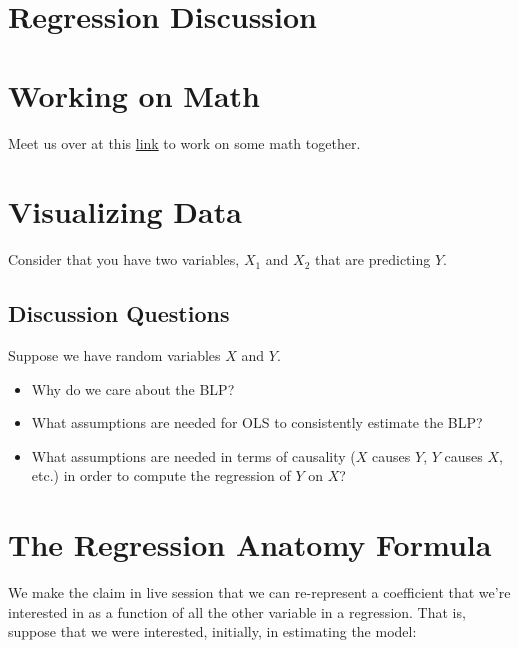 \documentclass[
]{book}
\providecommand{\tightlist}{%
  \setlength{\itemsep}{0pt}\setlength{\parskip}{0pt}}
\theoremstyle{definition}
\theoremstyle{definition}
\theoremstyle{definition}
\theoremstyle{definition}
\theoremstyle{remark}
\begin{document}
\hypertarget{regression-discussion}{%
\section{Regression Discussion}\label{regression-discussion}}

\hypertarget{working-on-math}{%
\section{Working on Math}\label{working-on-math}}

Meet us over at this \href{https://miro.com/welcomeonboard/OWZ3SHlpeVBMYjdnc2xXUFhzQVNWaFpnTkg2dmF1Z3I1UUJBWVZobWFOeVduSHJNTTRSQUt3akVyQUt0MnAyM3wzNDU4NzY0NTE4MDA4MjA1NTc3?invite_link_id=319921528710}{link} to work on some math together.

\hypertarget{visualizing-data}{%
\section{Visualizing Data}\label{visualizing-data}}

Consider that you have two variables, \(X_{1}\) and \(X_{2}\) that are predicting \(Y\).

\hypertarget{discussion-questions}{%
\subsection{Discussion Questions}\label{discussion-questions}}

Suppose we have random variables \(X\) and \(Y\).

\begin{itemize}
\tightlist
\item
  Why do we care about the BLP?
\item
  What assumptions are needed for OLS to consistently estimate the BLP?
\item
  What assumptions are needed in terms of causality (\(X\) causes \(Y\), \(Y\) causes \(X\), etc.) in order to compute the regression of \(Y\) on \(X\)?
\end{itemize}

\hypertarget{the-regression-anatomy-formula}{%
\section{The Regression Anatomy Formula}\label{the-regression-anatomy-formula}}

We make the claim in live session that we can re-represent a coefficient that we're interested in as a function of all the other variable in a regression. That is, suppose that we were interested, initially, in estimating the model:
\end{document}
